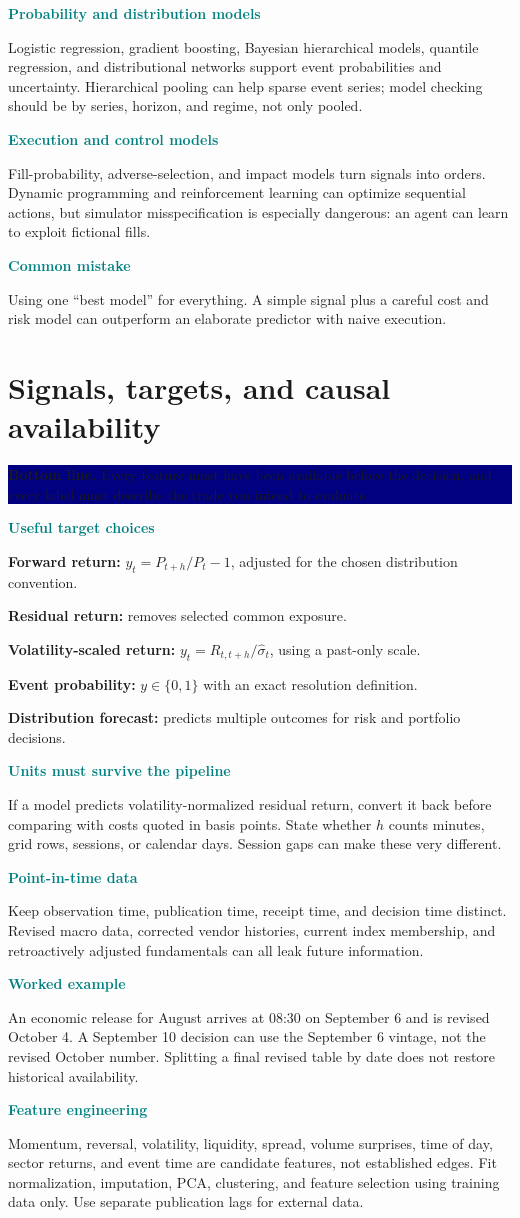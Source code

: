 \documentclass[10pt,letterpaper]{article}
\newcommand{\bl}[1]{\noindent\colorbox{navy}{\parbox{\dimexpr\linewidth-2\fboxsep}{\color{white}\textbf{Bottom line.} #1}}\par\medskip}
\newcommand{\topic}[2]{\clearpage\section{#1}\bl{#2}}
\newcommand{\sub}[1]{\par\textbf{\textcolor{teal}{#1}}\par}
\newcommand{\ex}[1]{\sub{Worked example}#1}
\newcommand{\pit}[1]{\sub{Common mistake}#1}
\begin{document}
\sub{Probability and distribution models}
Logistic regression, gradient boosting, Bayesian hierarchical models, quantile regression, and distributional networks support event probabilities and uncertainty. Hierarchical pooling can help sparse event series; model checking should be by series, horizon, and regime, not only pooled.
\sub{Execution and control models}
Fill-probability, adverse-selection, and impact models turn signals into orders. Dynamic programming and reinforcement learning can optimize sequential actions, but simulator misspecification is especially dangerous: an agent can learn to exploit fictional fills.
\pit{Using one ``best model'' for everything. A simple signal plus a careful cost and risk model can outperform an elaborate predictor with naive execution.}
\topic{Signals, targets, and causal availability}{Every feature must have been available before the decision, and every label must describe the trade you intend to evaluate.}
\sub{Useful target choices}
\textbf{Forward return:} $y_t=P_{t+h}/P_t-1$, adjusted for the chosen distribution convention.\par
\textbf{Residual return:} removes selected common exposure.\par
\textbf{Volatility-scaled return:} $y_t=R_{t,t+h}/\widehat\sigma_t$, using a past-only scale.\par
\textbf{Event probability:} $y\in\{0,1\}$ with an exact resolution definition.\par
\textbf{Distribution forecast:} predicts multiple outcomes for risk and portfolio decisions.
\sub{Units must survive the pipeline}
If a model predicts volatility-normalized residual return, convert it back before comparing with costs quoted in basis points. State whether $h$ counts minutes, grid rows, sessions, or calendar days. Session gaps can make these very different.
\sub{Point-in-time data}
Keep observation time, publication time, receipt time, and decision time distinct. Revised macro data, corrected vendor histories, current index membership, and retroactively adjusted fundamentals can all leak future information.
\ex{An economic release for August arrives at 08:30 on September 6 and is revised October 4. A September 10 decision can use the September 6 vintage, not the revised October number. Splitting a final revised table by date does not restore historical availability.}
\sub{Feature engineering}
Momentum, reversal, volatility, liquidity, spread, volume surprises, time of day, sector returns, and event time are candidate features, not established edges. Fit normalization, imputation, PCA, clustering, and feature selection using training data only. Use separate publication lags for external data.
\end{document}

